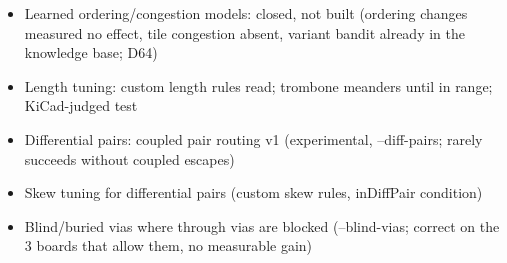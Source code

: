 \begin{itemize}[leftmargin=1.6em,itemsep=1pt]
\item[\textcolor{fraqua}{$\checkmark$}] Learned ordering/congestion models: closed, not built (ordering changes measured no effect, tile congestion absent, variant bandit already in the knowledge base; D64)
\item[\textcolor{fraqua}{$\checkmark$}] Length tuning: custom length rules read; trombone meanders until in range; KiCad-judged test
\item[\textcolor{fraqua}{$\checkmark$}] Differential pairs: coupled pair routing v1 (experimental, --diff-pairs; rarely succeeds without coupled escapes)
\item[\textcolor{fraqua}{$\checkmark$}] Skew tuning for differential pairs (custom skew rules, inDiffPair condition)
\item[\textcolor{fraqua}{$\checkmark$}] Blind/buried vias where through vias are blocked (--blind-vias; correct on the 3 boards that allow them, no measurable gain)
\end{itemize}
